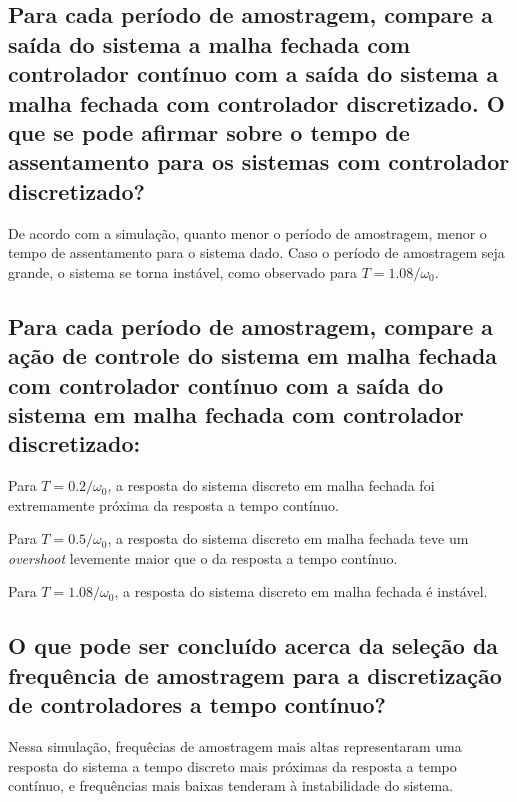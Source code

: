\documentclass{article}
\begin{document}
\subsection{Para cada período de amostragem, compare a saída do sistema a malha fechada com controlador contínuo com a saída do sistema a malha fechada com controlador discretizado. O que se pode afirmar sobre o tempo de assentamento para os sistemas com controlador discretizado?}
    {De acordo com a simulação, quanto menor o período de amostragem, menor o
    tempo de assentamento para o sistema dado. Caso o período de amostragem seja
    grande, o sistema se torna instável, como observado para $T = 1.08/\omega_0$.}


\subsection{Para cada período de amostragem, compare a ação de controle do sistema em malha fechada com controlador contínuo com a saída do sistema em malha fechada com controlador discretizado:}
    {Para $T = 0.2/\omega_0$, a resposta do sistema discreto em malha fechada foi
    extremamente próxima da resposta a tempo contínuo.}

    {Para $T = 0.5/\omega_0$, a resposta do sistema discreto em malha fechada teve
    um \textit{overshoot} levemente maior que o da resposta a tempo contínuo.}

    {Para $T = 1.08/\omega_0$, a resposta do sistema discreto em malha fechada é instável.}


\subsection{O que pode ser concluído acerca da seleção da frequência de amostragem para a discretização de controladores a tempo contínuo?}
    {Nessa simulação, frequêcias de amostragem mais altas representaram uma
    resposta do sistema a tempo discreto mais próximas da resposta a tempo
    contínuo, e frequências mais baixas tenderam à instabilidade do sistema.}
\end{document}
